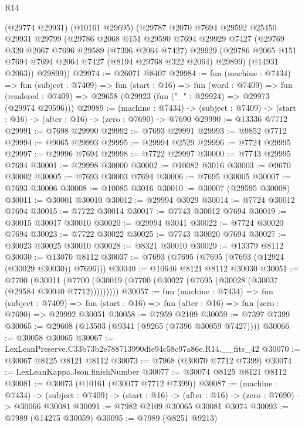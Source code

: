\begin{lexlean}{R14}
\begin{coremodule}
    (@29774 @29931)
    (@10161 @29695)
    (@29787
      @2070
      @7694
      @29592
      @25450
      @29931
      @29799
      (@29786
        @2068
        @151
        @29590
        @7694
        @29929
        @7427
        (@29769
          @320
          @2067
          @7696
          @29589
          (@7396 @2064 @7427)
          @29929
          (@29786 @2065 @151 @7694 @7694 @2064 @7427 (@8194 @29768 @322 @2064) @29899)
          (@14931 @2063))
        @29899))
@29974 := @26071 @8407
@29984 := fun (machine : @7434) =>
  fun (subject : @7409) =>
  fun (start : @16) =>
  fun (word : @7409) =>
  fun (rendered : @7409) => @29658 (@29923 (fun ("_" : @29924) => @29973 (@29974 @29596)))
@29989 := (machine : @7434) ->
  (subject : @7409) -> (start : @16) -> (after : @16) -> (zero : @7690) -> @7690
@29990 := @13336 @7712
@29991 := @7698 @29990
@29992 := @7693 @29991
@29993 := @9852 @7712
@29994 := @9065 @29993
@29995 := @29994 @2529
@29996 := @7724 @29995
@29997 := @29996 @7694
@29998 := @7722 @29997
@30000 := @7743 @29995 @7694
@30001 := @29998 @30000
@30002 := @10082 @3016
@30003 := @9670 @30002
@30005 := @7693 @30003 @7694
@30006 := @7695 @30005
@30007 := @7693 @30006
@30008 := @10085 @3016
@30010 := @30007 (@29595 @30008)
@30011 := @30001 @30010
@30012 := @29994 @3029
@30014 := @7724 @30012 @7694
@30015 := @7722 @30014
@30017 := @7743 @30012 @7694
@30019 := @30015 @30017 @30010
@30020 := @29994 @3041
@30022 := @7724 @30020 @7694
@30023 := @7722 @30022
@30025 := @7743 @30020 @7694
@30027 := @30023 @30025 @30010
@30028 := @8321 @30010
@30029 := @13379 @8112
@30030 := @13070 @8112
@30037 := @7693 (@7695 (@7695 (@7693 (@12924 (@30029 @30030)) @7696)))
@30040 := @10646 @8121 @8112 @30030
@30051 := @7700
    (@30011 (@7700 (@30019 (@7700 (@30027 (@7695 (@30028 (@30037 (@29584 @30040 @7712)))))))))
@30057 := fun (machine : @7434) =>
  fun (subject : @7409) =>
  fun (start : @16) => fun (after : @16) => fun (zero : @7690) => @29992 @30051
@30058 := @7959 @2109
@30059 := @7397 @7399
@30065 := @29608 (@13503 (@9341 (@9265 (@7396 @30059 @7427))))
@30066 := @30058 @30065
@30067 := LexLeanPreserve.C33b73b2e788713990dfe94c58c97a86e.R14.__fits_42
@30070 := @30067 @8125 @8121 @8112
@30073 := @7968 (@30070 @7712 @7399)
@30074 := LexLeanKappa.Json.finishNumber
@30077 := @30074 @8125 @8121 @8112
@30081 := @30073 (@10161 (@30077 @7712 @7399))
@30087 := (machine : @7434) ->
  (subject : @7409) -> (start : @16) -> (after : @16) -> (zero : @7690) -> @30066 @30081
@30091 := @7982 @2109 @30065 @30081 @3074
@30093 := @7989 (@14275 @30059)
@30095 := @7989 (@8251 @9213)

\end{coremodule}
\end{lexlean}
